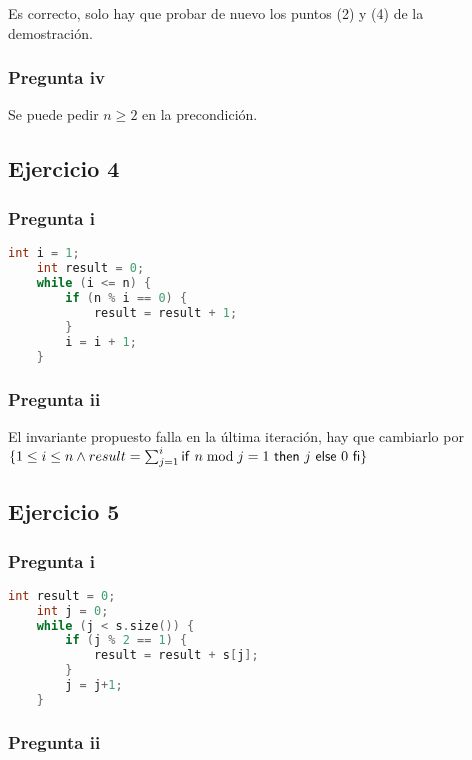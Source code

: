 Es correcto, solo hay que probar de nuevo los puntos (2) y (4) de la demostración.

\subsubsection{Pregunta iv}

Se puede pedir $ n \geq 2 $ en la precondición.

\subsection{Ejercicio 4}

\subsubsection{Pregunta i}

\begin{lstlisting}[language = C++]
    int i = 1;
    int result = 0;
    while (i <= n) {
        if (n % i == 0) {
            result = result + 1;
        }
        i = i + 1;
    }
\end{lstlisting}

\subsubsection{Pregunta ii}

El invariante propuesto falla en la última iteración, hay que cambiarlo por \\
$ \{ 1 \leq i \leq n \wedge result = \sum_{j = 1}^{i}\mathsf{if}\ n \bmod j = 1\ \mathsf{then}\ j\ \mathsf{else}\ 0\ \mathsf{fi} \} $

\subsection{Ejercicio 5}

\subsubsection{Pregunta i}
\pagebreak
\begin{lstlisting}[language = C++]
    int result = 0;
    int j = 0;
    while (j < s.size()) {
        if (j % 2 == 1) {
            result = result + s[j];
        }
        j = j+1;
    }
\end{lstlisting}

\subsubsection{Pregunta ii}

